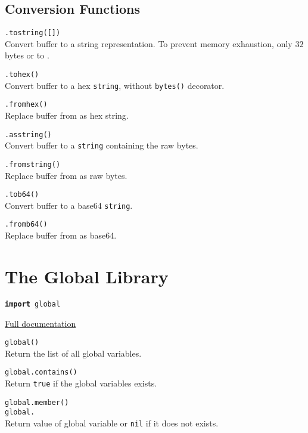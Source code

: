 \subsection*{Conversion Functions}

\hangpar {}\texttt{.tostring([}\texttt{])}\\
Convert  buffer to a string representation. To prevent memory exhaustion, only $32$ bytes or to .

\hangpar {}\texttt{.tohex()}\\
Convert  buffer to a hex \texttt{string}, without \texttt{bytes()} decorator.

\hangpar {}\texttt{.fromhex(}\texttt{)}\\
Replace  buffer from  as hex string.

\hangpar {}\texttt{.asstring()}\\
Convert  buffer to a \texttt{string} containing the raw bytes.

\hangpar {}\texttt{.fromstring(}\texttt{)}\\
Replace  buffer from  as raw bytes.

\hangpar {}\texttt{.tob64()}\\
Convert  buffer to a base64 \texttt{string}.

\hangpar {}\texttt{.fromb64(}\texttt{)}\\
Replace  buffer from  as base64.

\section*{The Global Library}

\hangpar \texttt{\textbf{import} global}

\hangpar \href{https://github.com/berry-lang/berry/wiki/Chapter-7\#module-global}{Full documentation}

\hangpar \texttt{global()}\\
Return the list of all global variables.

\hangpar \texttt{global.contains(}\texttt{)} \\
Return \texttt{true} if the global variables exists.

\hangpartwo \texttt{global.member(}\texttt{)}\\
\texttt{global.} \\	
Return value of global variable  or \texttt{nil} if it does not exists.

